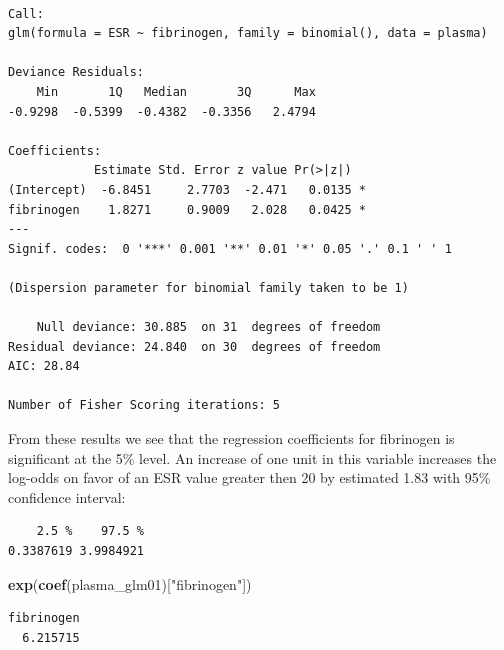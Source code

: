 \documentclass[
]{article}
\newenvironment{Shaded}{\begin{snugshade}}{\end{snugshade}}
\newcommand{\CommentTok}[1]{\textcolor[rgb]{0.56,0.35,0.01}{\textit{#1}}}
\newcommand{\DataTypeTok}[1]{\textcolor[rgb]{0.13,0.29,0.53}{#1}}
\newcommand{\KeywordTok}[1]{\textcolor[rgb]{0.13,0.29,0.53}{\textbf{#1}}}
\newcommand{\NormalTok}[1]{#1}
\newcommand{\StringTok}[1]{\textcolor[rgb]{0.31,0.60,0.02}{#1}}
\begin{document}
\begin{verbatim}

Call:
glm(formula = ESR ~ fibrinogen, family = binomial(), data = plasma)

Deviance Residuals: 
    Min       1Q   Median       3Q      Max  
-0.9298  -0.5399  -0.4382  -0.3356   2.4794  

Coefficients:
            Estimate Std. Error z value Pr(>|z|)  
(Intercept)  -6.8451     2.7703  -2.471   0.0135 *
fibrinogen    1.8271     0.9009   2.028   0.0425 *
---
Signif. codes:  0 '***' 0.001 '**' 0.01 '*' 0.05 '.' 0.1 ' ' 1

(Dispersion parameter for binomial family taken to be 1)

    Null deviance: 30.885  on 31  degrees of freedom
Residual deviance: 24.840  on 30  degrees of freedom
AIC: 28.84

Number of Fisher Scoring iterations: 5
\end{verbatim}

From these results we see that the regression coefficients for
fibrinogen is significant at the 5\% level. An increase of one unit in
this variable increases the log-odds on favor of an ESR value greater
then 20 by estimated 1.83 with 95\% confidence interval:

\begin{Shaded}
\end{Shaded}

\begin{verbatim}
    2.5 %    97.5 % 
0.3387619 3.9984921 
\end{verbatim}

\begin{Shaded}
\begin{Highlighting}[]
\KeywordTok{exp}\NormalTok{(}\KeywordTok{coef}\NormalTok{(plasma_glm01)[}\StringTok{"fibrinogen"}\NormalTok{])}
\end{Highlighting}
\end{Shaded}

\begin{verbatim}
fibrinogen 
  6.215715 
\end{verbatim}
\end{document}
